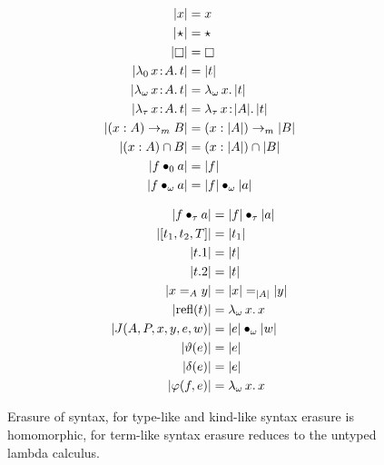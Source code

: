 

\begin{figure}
    \centering
    \begin{minipage}{0.5\textwidth}
        \begin{align*}
            |x| &= x \\
            |\!\star\!| &= \star \\
            |\kind| &= \kind \\
            |\abs{\lambda_0}{x}{A}{t}| &= |t| \\
            |\abs{\lambda_\omega}{x}{A}{t}| &= \absu{\lambda_\omega}{x}{|t|} \\
            |\abs{\lambda_\tau}{x}{A}{t}| &= \abs{\lambda_\tau}{x}{|A|}{|t|} \\
            |(x:A) \to_m B| &= (x:|A|) \to_m |B| \\
            |(x:A) \cap B| &= (x:|A|) \cap |B| \\
            |\app{f}{0}{a}| &= |f| \\
            |\app{f}{\omega}{a}| &= \app{|f|}{\omega}{|a|}
        \end{align*}
    \end{minipage}%
    \begin{minipage}{0.5\textwidth}
        \begin{align*}
            |f \bullet_{\tau} a| &= |f| \bullet_{\tau} |a| \\
            |[t_1, t_2, T]| &= |t_1| \\
            |t.1| &= |t| \\
            |t.2| &= |t| \\
            |x =_A y| &= |x| =_{|A|} |y| \\
            |\text{refl}(t)| &= {\lambda_\omega}\, x.\, x \\
            |J(A, P, x, y, e, w)| &= |e| \bullet_{\omega} |w| \\
            |\vartheta(e)| &= |e| \\
            |\delta(e)| &= |e| \\
            |\varphi(f,e)| &= {\lambda_\omega}\, x.\, x
        \end{align*}
    \end{minipage}
    \caption{Erasure of syntax, for type-like and kind-like syntax erasure is homomorphic, for term-like syntax erasure reduces to the untyped lambda calculus.}
\end{figure}
